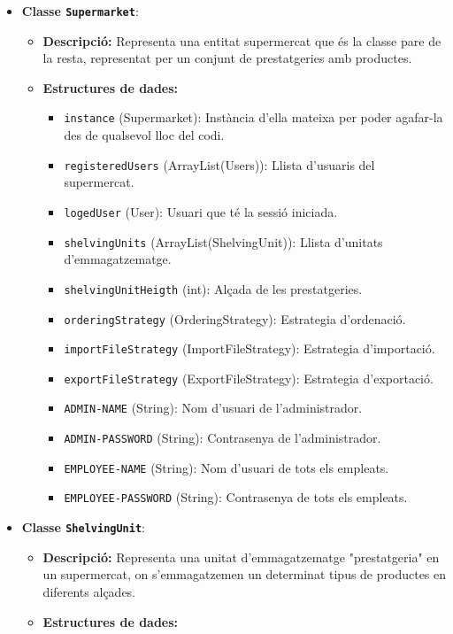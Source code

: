 \documentclass[a4paper,12pt]{report}
\begin{document}
	\begin{itemize}
		\item \textbf{Classe \texttt{Supermarket}}:
		\begin{itemize}
			\item \textbf{Descripció:} Representa una entitat supermercat que és la classe pare de la resta, representat per un conjunt de prestatgeries amb productes.
			\item \textbf{Estructures de dades:}
			\begin{itemize}
				\item \texttt{instance} (Supermarket): Instància d'ella mateixa per poder agafar-la des de qualsevol lloc del codi.
				\item \texttt{registeredUsers} (ArrayList(Users)): Llista d'usuaris del supermercat.
				\item \texttt{logedUser} (User): Usuari que té la sessió iniciada.
				\item \texttt{shelvingUnits} (ArrayList(ShelvingUnit)): Llista d'unitats d'emmagatzematge.
				\item \texttt{shelvingUnitHeigth} (int): Alçada de les prestatgeries.
				\item \texttt{orderingStrategy} (OrderingStrategy): Estrategia d'ordenació.
				\item \texttt{importFileStrategy} (ImportFileStrategy): Estrategia d'importació.
				\item \texttt{exportFileStrategy} (ExportFileStrategy): Estrategia d'exportació.
				\item \texttt{ADMIN-NAME} (String): Nom d'usuari de l'administrador.
				\item \texttt{ADMIN-PASSWORD} (String): Contrasenya de l'administrador.
				\item \texttt{EMPLOYEE-NAME} (String): Nom d'usuari de tots els empleats.
				\item \texttt{EMPLOYEE-PASSWORD} (String): Contrasenya de tots els empleats.
			\end{itemize}
		\end{itemize}
		\item \textbf{Classe \texttt{ShelvingUnit}}:
		\begin{itemize}
			\item \textbf{Descripció:} Representa una unitat d'emmagatzematge "prestatgeria" en un supermercat, on s'emmagatzemen un determinat tipus de productes en diferents alçades.
			\item \textbf{Estructures de dades:}
			\begin{itemize}

\end{itemize}
\end{itemize}
\end{itemize}
\end{document}
